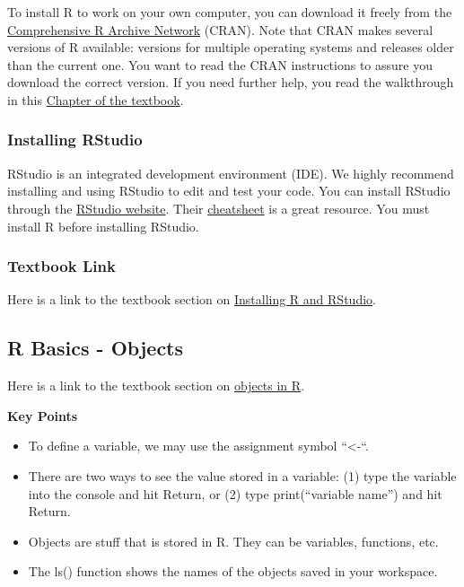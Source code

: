 \documentclass[
]{article}
\providecommand{\tightlist}{%
  \setlength{\itemsep}{0pt}\setlength{\parskip}{0pt}}
\begin{document}
To install R to work on your own computer, you can download it freely
from the \href{https://cran.r-project.org}{Comprehensive R Archive
Network} (CRAN). Note that CRAN makes several versions of R available:
versions for multiple operating systems and releases older than the
current one. You want to read the CRAN instructions to assure you
download the correct version. If you need further help, you read the
walkthrough in this
\href{https://rafalab.github.io/dsbook/installing-r-rstudio.html\#installing-r}{Chapter
of the textbook}.

\hypertarget{installing-rstudio}{%
\subsubsection{Installing RStudio}\label{installing-rstudio}}

RStudio is an integrated development environment (IDE). We highly
recommend installing and using RStudio to edit and test your code. You
can install RStudio through the
\href{https://rstudio.com/products/rstudio/download/}{RStudio website}.
Their
\href{https://rstudio.com/wp-content/uploads/2016/01/rstudio-IDE-cheatsheet.pdf}{cheatsheet}
is a great resource. You must install R before installing RStudio.

\hypertarget{textbook-link}{%
\subsubsection{Textbook Link}\label{textbook-link}}

Here is a link to the textbook section on
\href{https://rafalab.github.io/dsbook/installing-r-rstudio.html}{Installing
R and RStudio}.

\hypertarget{r-basics---objects}{%
\subsection{R Basics - Objects}\label{r-basics---objects}}

Here is a link to the textbook section on
\href{https://rafalab.github.io/dsbook/r-basics.html\#objects}{objects
in R}.

\textbf{Key Points}

\begin{itemize}
\tightlist
\item
  To define a variable, we may use the assignment symbol ``\textless-``.
\item
  There are two ways to see the value stored in a variable: (1) type the
  variable into the console and hit Return, or (2) type print(``variable
  name'') and hit Return.
\item
  Objects are stuff that is stored in R. They can be variables,
  functions, etc.
\item
  The ls() function shows the names of the objects saved in your
  workspace.
\end{itemize}
\end{document}
